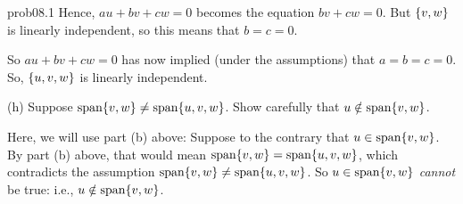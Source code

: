 \begin{sol}{prob08.1}
Hence,  $a u + bv+ cw=0$ becomes the equation  $bv+ cw=0$. But $\{v,w \}$ is linearly independent, so this means that $b=c=0$. 

So $a u + bv+ cw=0$ has now implied (under the assumptions) that $a=b=c=0$. So, $\{u,v,w \}$ is linearly independent.
\medskip
% 

(h)  Suppose $\textrm{span}\{v,w\}\not=\textrm{span}\{u,v,w\}$. Show carefully that $u \notin \textrm{span}\{v,w\}$.

\soln Here, we will use part (b) above: Suppose to the contrary that   $u\in \textrm{span}\{v,w\}$. By part (b) above, that would mean $\textrm{span}\{v,w\}=\textrm{span}\{u,v,w\}$, which contradicts the assumption $\textrm{span}\{v,w\}\not=\textrm{span}\{u,v,w\}$. So $u\in \textrm{span}\{v,w\}$ {\it cannot} be true: i.e., $u\notin \textrm{span}\{v,w\}$.
\medskip

\end{sol}

